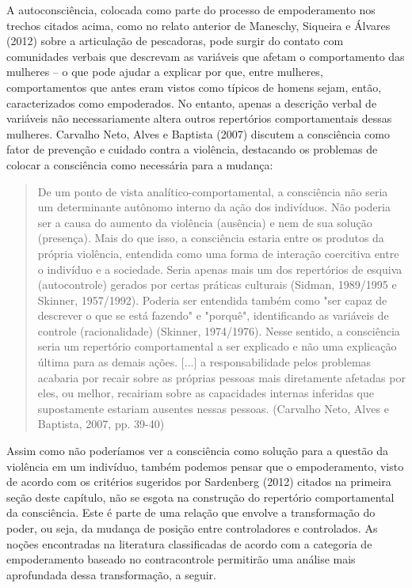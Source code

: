 A autoconsciência, colocada como parte do processo de empoderamento nos trechos citados acima, como no relato anterior de Maneschy, Siqueira e Álvares (2012) sobre a articulação de pescadoras, pode surgir do contato com comunidades verbais que descrevam as variáveis que afetam o comportamento das mulheres – o que pode ajudar a explicar por que, entre mulheres, comportamentos que antes eram vistos como típicos de homens sejam, então, caracterizados como empoderados. No entanto, apenas a descrição verbal de variáveis não necessariamente altera outros repertórios comportamentais dessas mulheres. Carvalho Neto, Alves e Baptista (2007) discutem a consciência como fator de prevenção e cuidado contra a violência, destacando os problemas de colocar a consciência como necessária para a mudança:

\begin{quote}
    De um ponto de vista analítico-comportamental, a consciência não seria um determinante autônomo interno da ação dos indivíduos. Não poderia ser a causa do aumento da violência (ausência) e nem de sua solução (presença). Mais do que isso, a consciência estaria entre os produtos da própria violência, entendida como uma forma de interação coercitiva entre o indivíduo e a sociedade. Seria apenas mais um dos repertórios de esquiva (autocontrole) gerados por certas práticas culturais (Sidman, 1989/1995 e Skinner, 1957/1992). Poderia ser entendida também como "ser capaz de descrever o que se está fazendo" e "porquê", identificando as variáveis de controle (racionalidade) (Skinner, 1974/1976). Nesse sentido, a consciência seria um repertório comportamental a ser explicado e não uma explicação última para as demais ações. [...] a responsabilidade pelos problemas acabaria por recair sobre as próprias pessoas mais diretamente afetadas por eles, ou melhor, recairiam sobre as capacidades internas inferidas que supostamente estariam ausentes nessas pessoas. (Carvalho Neto, Alves e Baptista, 2007, pp. 39-40)
\end{quote}

Assim como não poderíamos ver a consciência como solução para a questão da violência em um indivíduo, também podemos pensar que o empoderamento, visto de acordo com os critérios sugeridos por Sardenberg (2012) citados na primeira seção deste capítulo, não se esgota na construção do repertório comportamental da consciência. Este é parte de uma relação que envolve a transformação do poder, ou seja, da mudança de posição entre controladores e controlados. As noções encontradas na literatura classificadas de acordo com a categoria de empoderamento baseado no contracontrole permitirão uma análise mais aprofundada dessa transformação, a seguir.

